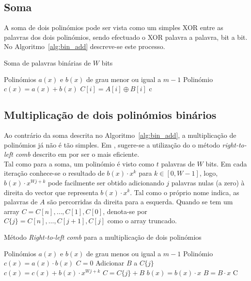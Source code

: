 \subsection{Soma}
A soma de dois polinómios pode ser vista como um simples XOR entre as palavras dos dois polinómios, sendo efectuado o XOR palavra a palavra, bit a bit. No Algoritmo~\ref{alg:bin_add} descreve-se este processo.
\begin{algorithm}
  \caption{Soma de palavras binárias de $W$ bits}\label{alg:bin_add}

  \begin{algorithmic}
    \Require Polinómios $a(x)$ e $b(x)$ de grau menor ou igual a $m-1$
    \Ensure Polinómio $c(x) = a(x) + b(x)$
    \State    $C[i] = A[i] \oplus B[i]$
    \EndFor
    \State \Return c
  \end{algorithmic}
\end{algorithm}
\subsection{Multiplicação de dois polinómios binários}
Ao contrário da soma descrita no Algoritmo~\ref{alg:bin_add}, a multiplicação de polinómios já não é tão simples. Em \cite{lapin}, sugere-se a utilização do o método \textit{right-to-left comb} descrito em \cite{Hankerson:2003:GEC:940321} por ser o mais eficiente.\\
Tal como para a soma, um polinómio é visto como $t$ palavras de $W$ bits. Em cada iteração conhece-se o resultado de $b(x) \cdot x^k$ para $k \in [0, W-1]$, logo, $b(x) \cdot x^{Wj+k}$ pode facilmente ser obtido adicionando $j$ palavras nulas (a zero) à direita do vector que representa $b(x) \cdot x^k$. Tal como o próprio nome indica, as palavras de $A$ são percorridas da direita para a esquerda. Quando se tem um array $C = C[n],\dotsc,C[1],C[0]$, denota-se por $C\{j\} = C[n],\dotsc,C[j+1],C[j]$ como o array truncado.
\begin{algorithm}
  \caption{Método \textit{Right-to-left comb} para a multiplicação de dois polinómios}\label{alg:right_to_left}
  \begin{algorithmic}
    \Require Polinómios $a(x)$ e $b(x)$ de grau menos ou igual a $m-1$
    \Ensure Polinómio $c(x) = a(x) \cdot b(x)$
    \State $C = 0$
        \State Adicionar $B$ a $C\{j\}$
        \State $c(x) = c(x) + b(x) \cdot x^{Wj + k}$ %
        \State $C = C\{j\} + B$
        \EndIf
      \EndFor
      \State $b(x) = b(x) \cdot x$
      \State $B = B \cdot x$
      \EndIf
    \EndFor
    \State \Return C
  \end{algorithmic}
\end{algorithm}
